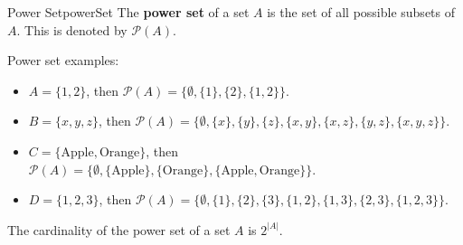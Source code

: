 \begin{definition}{Power Set}{powerSet}
  The \textbf{power set} of a set \( A \) is the set of all possible subsets of \( A \).
  This is denoted by \( \mathcal{P}(A) \).
\end{definition}

Power set examples:
\begin{itemize}
  \item \( A = \{ 1, 2 \} \), then \( \mathcal{P}(A) = \{ \emptyset, \{ 1 \}, \{ 2 \}, \{ 1, 2 \} \} \).
  \item \( B = \{ x, y, z \} \), then \( \mathcal{P}(A) = \{ \emptyset, \{ x \}, \{ y \}, \{ z \},
  \{ x, y \}, \{ x, z \}, \{ y, z \}, \{ x, y, z \} \} \).
  \item \( C = \{ \text{Apple}, \text{Orange} \} \), then \( \mathcal{P}(A) = \{ \emptyset,
  \{ \text{Apple} \}, \{ \text{Orange} \}, \{ \text{Apple}, \text{Orange} \} \} \).
  \item \( D = \{ 1, 2, 3 \} \), then \( \mathcal{P}(A) = \{ \emptyset, \{ 1 \}, \{ 2 \},
  \{ 3 \}, \{ 1, 2 \}, \{ 1, 3 \}, \{ 2, 3 \}, \{ 1, 2, 3 \} \} \).
\end{itemize}

The cardinality of the power set of a set \( A \) is \( 2^{|A|} \).
